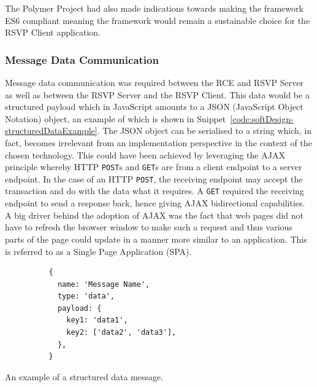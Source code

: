       The Polymer Project had also made indications towards making the framework ES6 compliant meaning the framework would remain a sustainable choice for the RSVP Client application.
      
    \subsubsection{Message Data Communication}
      Message data communication was required between the RCE and RSVP Server as well as between the RSVP Server and the RSVP Client. This data would be a structured payload which in JavaScript amounts to a JSON (JavaScript Object Notation) object, an example of which is shown in Snippet~\ref{code:softDesign-structuredDataExample}. The JSON object can be serialised to a string which, in fact, becomes irrelevant from an implementation perspective in the context of the chosen technology. This could have been achieved by leveraging the AJAX principle whereby HTTP \texttt{POST}s and \texttt{GET}s are from a client endpoint to a server endpoint. In the case of an HTTP \texttt{POST}, the receiving endpoint may accept the transaction and do with the data what it requires. A \texttt{GET} required the receiving endpoint to send a response back, hence giving AJAX bidirectional capabilities. A big driver behind the adoption of AJAX was the fact that web pages did not have to refresh the browser window to make such a request and thus various parts of the page could update in a manner more similar to an application. This is referred to as a Single Page Application (SPA).
      
      \begin{code}
        \begin{verbatim}
          {
            name: 'Message Name',
            type: 'data',
            payload: {
              key1: 'data1',
              key2: ['data2', 'data3'],
            },
          }
        \end{verbatim}
        \caption{An example of a structured data message.}
        \label{code:softDesign-structuredDataExample}
      \end{code}
      
